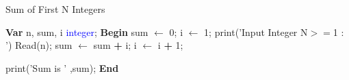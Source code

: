 \begin{algorithm}
\caption{Sum of First N Integers}
\begin{algorithmic}[1]
\State \textbf{\textcolor{redPlot}{Var}}
\State n, sum, i \textcolor{blue}{integer};
\vspace{0.5em}
\State  \textbf{\textcolor{redPlot}{Begin}}
\State sum $\gets$ 0; 
\State  i $\gets$ 1;
\vspace{0.5em}
\State \textcolor{purplePlot!80!black}{print}(\textcolor{blueArea!60!black}{'Input Integer N\(>=\)1 : '}) 
\State \textcolor{purplePlot!80!black}{Read}(n);
\vspace{0.5em}
\State sum $\gets$ sum \textcolor{redPlot}{ \textbf{+}} i; 
\State i $\gets$ i \textcolor{redPlot}{ \textbf{+}} 1; 
\EndWhile

\vspace{0.5em}
\State \textcolor{purplePlot!80!black}{print}(\textcolor{blueArea!60!black}{'Sum is ' },{sum});
\vspace{0.5em}
\State  \textbf{\textcolor{redPlot}{End}}
\end{algorithmic}
\end{algorithm}
